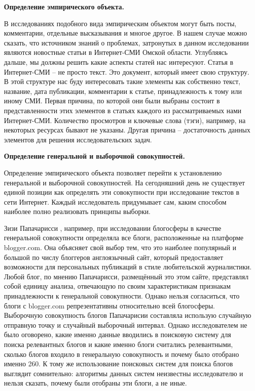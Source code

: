 \textbf{Определение эмпирического объекта.} 

В исследованиях подобного вида эмпирическим объектом могут быть посты, комментарии, отдельные высказывания и многое другое. В нашем случае можно сказать, что источником знаний о проблемах, затронутых в данном исследовании являются новостные статьи в Интернет-СМИ Омской области. Углубляясь дальше, мы должны решить какие аспекты статей нас интересуют. Статья в Интернет-СМИ -- не просто текст. Это документ, который имеет свою структуру. В этой структуре нас буду интересовать такие элементы как собственно текст, название, дата публикации, комментарии к статье, принадлежность к тому или иному СМИ. Первая причина, по которой они были выбраны состоит в представленности этих элементов в статьях каждого из рассматриваемых нами Интернет-СМИ. Количество просмотров и ключевые слова (тэги), например, на некоторых ресурсах бывают не указаны. Другая причина -- достаточность данных элементов для решения исследовательских задач.

\textbf{Определение генеральной и выборочной совокупностей.}

Определение эмпирического объекта позволяет перейти к установлению генеральной и выборочной совокупностей. На сегодняшний день не существует единой позиции как определять эти совокупности при исследование текстов в сети Интернет. Каждый исследователь придумывает сам, каким способом наиболее полно реализовать принципы выборки.

Зизи Папачарисси \cite{zizi}, например, при исследовании блогосферы в качестве генеральной совокупности определяла все блоги, расположенные на платформе blogger.com. Она объясняет свой выбор тем, что это наиболее популярный и большой по числу блоггеров англоязычный сайт, который предоставляет возможности для персональных публикаций в стиле любительской журналистики. Любой блог, по мнению Папачарисси, размещённый это этом сайте, представлял собой единицу анализа, отвечающую по своим характеристикам признакам принадлежности к генеральной совокупности. Однако нельзя согласиться, что блоги с blogger.com репрезентативны относительно всей блогосферы. Выборочную совокупность блогов Папачарисии составляла использую случайную отправную точку и случайный выборочный интервал. Однако исследователем не было оговорено, какие именно данные вводились в поисковую систему для поиска релевантных блогов и какие именно блоги считались релевантными, сколько блогов входило в генеральную совокупность и почему было отобрано именно 260. К тому же использование поисковых систем для поиска блогов выглядит сомнительно: алгоритмы данных систем неизвестны исследователю и нельзя сказать, почему были отобраны эти блоги, а не иные.

